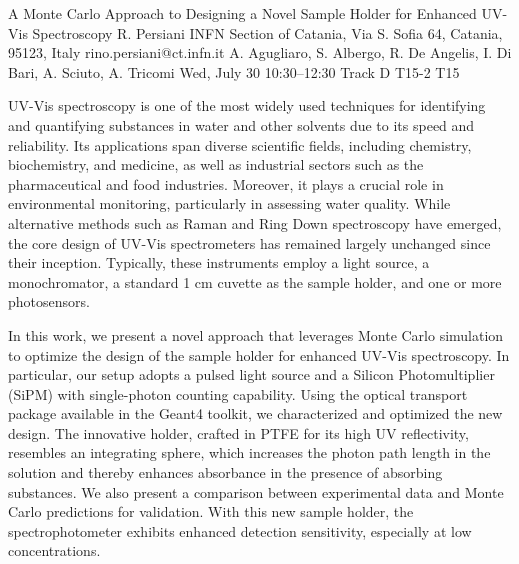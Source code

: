 \begin{talk}
  {A Monte Carlo Approach to Designing a Novel Sample Holder for Enhanced UV-Vis Spectroscopy}%
  {R. Persiani}%
  {INFN Section of Catania, Via S. Sofia 64, Catania, 95123, Italy}%
  {rino.persiani@ct.infn.it}%
  {A. Agugliaro, S. Albergo, R. De Angelis, I. Di Bari, A. Sciuto, A. Tricomi}%
  {}%
  {Wed, July 30 10:30–12:30 Track D}%
  {T15-2}%
  {T15}%
  
				
			
UV-Vis spectroscopy is one of the most widely used techniques for identifying and quantifying substances in water and other solvents due to its speed and reliability. Its applications span diverse scientific fields, including chemistry, biochemistry, and medicine, as well as industrial sectors such as the pharmaceutical and food industries. Moreover, it plays a crucial role in environmental monitoring, particularly in assessing water quality. While alternative methods such as Raman and Ring Down spectroscopy have emerged, the core design of UV-Vis spectrometers has remained largely unchanged since their inception. Typically, these instruments employ a light source, a monochromator, a standard 1 cm cuvette as the sample holder, and one or more photosensors.

In this work, we present a novel approach that leverages Monte Carlo simulation to optimize the design of the sample holder for enhanced UV-Vis spectroscopy. In particular, our setup adopts a pulsed light source and a Silicon Photomultiplier (SiPM) with single-photon counting capability. Using the optical transport package available in the Geant4 toolkit, we characterized and optimized the new design. The innovative holder, crafted in PTFE for its high UV reflectivity, resembles an integrating sphere, which increases the photon path length in the solution and thereby enhances absorbance in the presence of absorbing substances. We also present a comparison between experimental data and Monte Carlo predictions for validation. With this new sample holder, the spectrophotometer exhibits enhanced detection sensitivity, especially at low concentrations.

\medskip

\end{talk}

